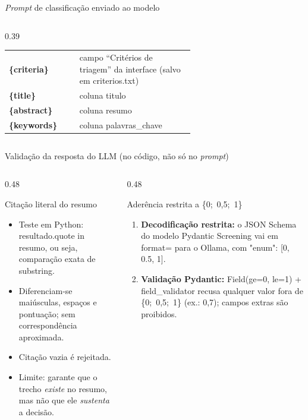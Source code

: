 \documentclass[aspectratio=169, 10pt]{beamer}
\newcommand{\pvar}[1]{\textcolor{accentgold}{\textbf{\{#1\}}}}
\newcommand{\cod}[1]{{\ttfamily\color{radargreen}#1}}
\begin{document}
\begin{frame}[t]{\emph{Prompt} de classificação enviado ao modelo}
\begin{columns}[T,onlytextwidth]
\begin{column}{0.39\textwidth}
\begin{tabular}{@{}l >{\raggedright\arraybackslash}p{0.62\linewidth}@{}}
        \toprule
        \pvar{criteria} & campo ``Critérios de triagem'' da interface (salvo em \cod{criterios.txt}) \\
        \pvar{title}    & coluna \cod{titulo} \\
        \pvar{abstract} & coluna \cod{resumo} \\
        \pvar{keywords} & coluna \cod{palavras\_chave} \\
        \bottomrule
      \end{tabular}
      \vspace{5pt}
    \end{column}
  \end{columns}
\end{frame}

\begin{frame}[t]{Validação da resposta do LLM (no código, não só no \emph{prompt})}
  \small
  \begin{columns}[T,onlytextwidth]
    \begin{column}{0.48\textwidth}
      \begin{block}{Citação literal do resumo}
        \footnotesize
        \begin{itemize}\setlength{\itemsep}{2pt}
          \item Teste em Python: \cod{resultado.quote in resumo}, ou seja, comparação exata de substring.
          \item Diferenciam-se maiúsculas, espaços e pontuação; sem correspondência aproximada.
          \item Citação vazia é rejeitada.
          \item \textcolor{accentgold}{Limite:} garante que o trecho \emph{existe} no resumo, mas não que ele \emph{sustenta} a decisão.
        \end{itemize}
      \end{block}
    \end{column}
    \begin{column}{0.48\textwidth}
      \begin{block}{Aderência restrita a \{0;\ 0,5;\ 1\}}
        \footnotesize
        \begin{enumerate}\setlength{\itemsep}{2pt}
          \item \textbf{Decodificação restrita:} o JSON Schema do modelo Pydantic \cod{Screening} vai em \cod{format=} para o Ollama, com \cod{"enum": [0, 0.5, 1]}.
          \item \textbf{Validação Pydantic:} \cod{Field(ge=0, le=1)} + \cod{field\_validator} recusa qualquer valor fora de \{0;\ 0,5;\ 1\} (ex.: 0,7); campos extras são proibidos.

\end{enumerate}
\end{block}
\end{column}
\end{columns}
\end{frame}
\end{document}

